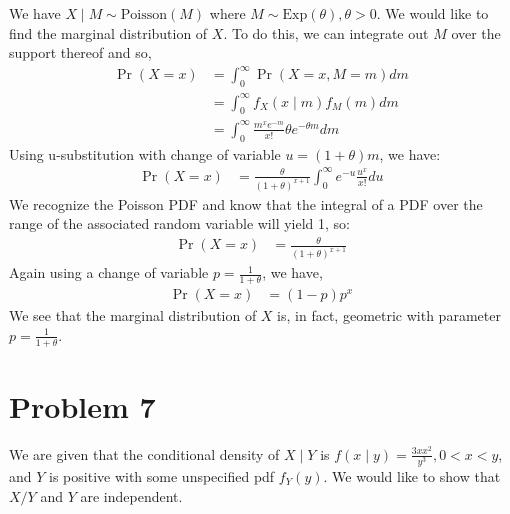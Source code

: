 \documentclass[11pt]{article}
\begin{document}
\begin{enumerate}[(a)]
We have $X \mid M \sim \mathrm{Poisson}(M)$ where $M \sim
\mathrm{Exp}(\theta), \theta > 0$.  We would like to find the marginal
distribution of $X$.  To do this, we can integrate out $M$ over the
support thereof and so,
\begin{align*}
  \Pr{(X = x)} &= \int_0^{\infty} \Pr{(X=x,M=m)} dm \\
  &= \int_0^{\infty} f_X(x \mid m) f_M(m) dm \\
  &= \int_0^{\infty} \frac{m^x e^{-m}}{x!}
    \theta e^{-\theta m} dm
\end{align*}
Using u-substitution with change of variable $u = (1+\theta)m$, we
have:
\begin{align*}
  \Pr{(X=x)} &= \frac{\theta}{(1+\theta)^{x+1}} \int_0^{\infty} e^{-u}
               \frac{u^x}{x!} du
\end{align*}
We recognize the Poisson PDF and know that the integral of a PDF over
the range of the associated random variable will yield 1, so:
\begin{align*}
  \Pr{(X=x)} &= \frac{\theta}{(1+\theta)^{x+1}}
\end{align*}
Again using a change of variable $p = \frac{1}{1+\theta}$, we have,
\begin{align*}
  \Pr{(X=x)} &= (1-p)p^x
\end{align*}
We see that the marginal distribution of $X$ is, in fact, geometric with parameter $p =
\frac{1}{1+\theta}$.

\newpage

\section*{Problem 7}

We are given that the conditional density of $X \mid Y$ is $f(x \mid
y) = \frac{3xx^2}{y^3}, 0<x<y$, and $Y$ is positive with some
unspecified pdf $f_Y(y)$.  We would like to show that $X/Y$ and $Y$
are independent.


\end{enumerate}
\end{document}
